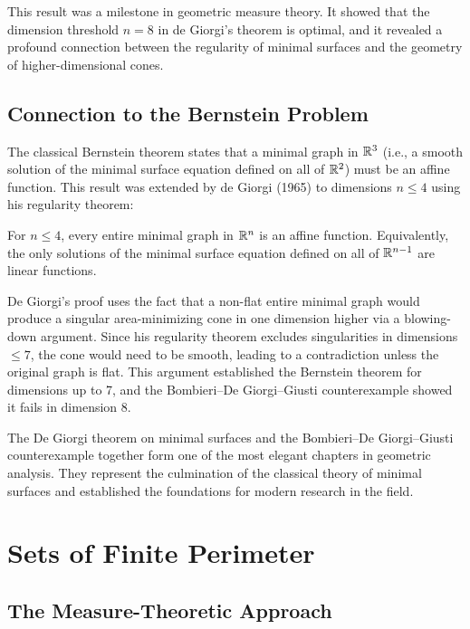 This result was a milestone in geometric measure theory. It showed that the dimension threshold \(n = 8\) in de Giorgi's theorem is optimal, and it revealed a profound connection between the regularity of minimal surfaces and the geometry of higher-dimensional cones.

\subsection{Connection to the Bernstein Problem}

The classical Bernstein theorem states that a minimal graph in \(\mathbb{R}^3\) (i.e., a smooth solution of the minimal surface equation defined on all of \(\mathbb{R}^2\)) must be an affine function. This result was extended by de Giorgi (1965) to dimensions \(n \leq 4\) using his regularity theorem:

\begin{theorem}[De Giorgi, 1965]
For \(n \leq 4\), every entire minimal graph in \(\mathbb{R}^n\) is an affine function. Equivalently, the only solutions of the minimal surface equation defined on all of \(\mathbb{R}^{n-1}\) are linear functions.
\end{theorem}

De Giorgi's proof uses the fact that a non-flat entire minimal graph would produce a singular area-minimizing cone in one dimension higher via a blowing-down argument. Since his regularity theorem excludes singularities in dimensions \(\leq 7\), the cone would need to be smooth, leading to a contradiction unless the original graph is flat. This argument established the Bernstein theorem for dimensions up to 7, and the Bombieri--De Giorgi--Giusti counterexample showed it fails in dimension 8.

The De Giorgi theorem on minimal surfaces and the Bombieri--De Giorgi--Giusti counterexample together form one of the most elegant chapters in geometric analysis. They represent the culmination of the classical theory of minimal surfaces and established the foundations for modern research in the field.

\section{Sets of Finite Perimeter}

\subsection{The Measure-Theoretic Approach}

